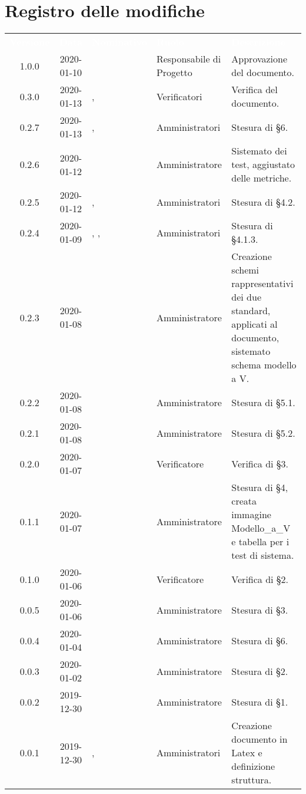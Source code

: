 \section*{Registro delle modifiche}
{
\renewcommand{\arraystretch}{1.5}
\centering
\begin{longtable}{ c c  C{4cm}  C{3cm} C{4cm}}
\textcolor{white}{\textbf{Versione}} & \textcolor{white}{\textbf{Data}} & \textcolor{white}{\textbf{Nominativo}} & \textcolor{white}{\textbf{Ruolo}} & \textcolor{white}{\textbf{Descrizione}}\\	

1.0.0 & 2020-01-10 & \SE{} & Responsabile di Progetto & Approvazione del documento. \\
0.3.0 & 2020-01-13 & \LD{}, \DF{} & Verificatori & Verifica del documento. \\

0.2.7 & 2020-01-13 & \MC{}, \AT{} & Amministratori & Stesura di §6. \\
0.2.6 & 2020-01-12 & \AT{} & Amministratore & Sistemato dei test, aggiustato delle metriche. \\
0.2.5 & 2020-01-12 & \MC{}, \BR{} & Amministratori & Stesura di §4.2. \\
0.2.4 & 2020-01-09 & \MC{}, \AT{}, \BR{} & Amministratori & Stesura di §4.1.3. \\
0.2.3 & 2020-01-08 & \AT{} & Amministratore & Creazione schemi rappresentativi dei due standard, applicati al documento, sistemato schema modello a V. \\
0.2.2 & 2020-01-08 & \MC{} & Amministratore & Stesura di §5.1. \\
0.2.1 & 2020-01-08 & \AT{} & Amministratore & Stesura di §5.2. \\
0.2.0 & 2020-01-07 & \DF{} & Verificatore & Verifica di §3. \\
0.1.1 & 2020-01-07 & \AT{} & Amministratore & Stesura di §4, creata immagine Modello\_a\_V e tabella per i test di sistema. \\
0.1.0 & 2020-01-06 & \LD{} & Verificatore & Verifica di §2. \\
0.0.5 & 2020-01-06 & \BR{} & Amministratore & Stesura di §3. \\
0.0.4 & 2020-01-04 & \MC{} & Amministratore & Stesura di §6. \\
0.0.3 & 2020-01-02 & \MC{} & Amministratore & Stesura di §2. \\
0.0.2 & 2019-12-30 & \AT{} & Amministratore & Stesura di §1. \\
0.0.1 & 2019-12-30 & \AT{}, \MC{} & Amministratori & Creazione documento in Latex e definizione struttura. \\	
		
\end{longtable}
}

